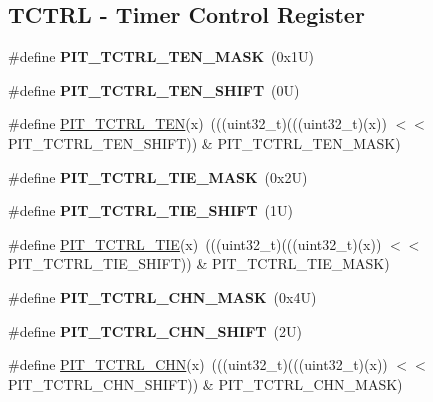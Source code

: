 \subsection*{T\+C\+T\+RL -\/ Timer Control Register}
\begin{DoxyCompactItemize}
\item 
\mbox{\label{group___p_i_t___register___masks_ga1099670711f996f5fa84e33bbfe794b2}} 
\#define {\bfseries P\+I\+T\+\_\+\+T\+C\+T\+R\+L\+\_\+\+T\+E\+N\+\_\+\+M\+A\+SK}~(0x1\+U)
\item 
\mbox{\label{group___p_i_t___register___masks_ga0080137ff0378087f08cc12fd10b3e1f}} 
\#define {\bfseries P\+I\+T\+\_\+\+T\+C\+T\+R\+L\+\_\+\+T\+E\+N\+\_\+\+S\+H\+I\+FT}~(0\+U)
\item 
\#define \mbox{\hyperlink{group___p_i_t___register___masks_gaecd36aa22b2758d6c39b6b2df234e3a8}{P\+I\+T\+\_\+\+T\+C\+T\+R\+L\+\_\+\+T\+EN}}(x)~(((uint32\+\_\+t)(((uint32\+\_\+t)(x)) $<$$<$ P\+I\+T\+\_\+\+T\+C\+T\+R\+L\+\_\+\+T\+E\+N\+\_\+\+S\+H\+I\+FT)) \& P\+I\+T\+\_\+\+T\+C\+T\+R\+L\+\_\+\+T\+E\+N\+\_\+\+M\+A\+SK)
\item 
\mbox{\label{group___p_i_t___register___masks_ga99639aabcac1d6042d14e7893d00bf67}} 
\#define {\bfseries P\+I\+T\+\_\+\+T\+C\+T\+R\+L\+\_\+\+T\+I\+E\+\_\+\+M\+A\+SK}~(0x2\+U)
\item 
\mbox{\label{group___p_i_t___register___masks_gae21aee9e81741a924c9f2824fbc5775b}} 
\#define {\bfseries P\+I\+T\+\_\+\+T\+C\+T\+R\+L\+\_\+\+T\+I\+E\+\_\+\+S\+H\+I\+FT}~(1\+U)
\item 
\#define \mbox{\hyperlink{group___p_i_t___register___masks_gaa39036db7a5f8baae6f986b5809d054c}{P\+I\+T\+\_\+\+T\+C\+T\+R\+L\+\_\+\+T\+IE}}(x)~(((uint32\+\_\+t)(((uint32\+\_\+t)(x)) $<$$<$ P\+I\+T\+\_\+\+T\+C\+T\+R\+L\+\_\+\+T\+I\+E\+\_\+\+S\+H\+I\+FT)) \& P\+I\+T\+\_\+\+T\+C\+T\+R\+L\+\_\+\+T\+I\+E\+\_\+\+M\+A\+SK)
\item 
\mbox{\label{group___p_i_t___register___masks_ga734e2e947c649d50b9ca46405e451c2b}} 
\#define {\bfseries P\+I\+T\+\_\+\+T\+C\+T\+R\+L\+\_\+\+C\+H\+N\+\_\+\+M\+A\+SK}~(0x4\+U)
\item 
\mbox{\label{group___p_i_t___register___masks_ga9a1c8aa25a05c9b2c9503a003fa8d24d}} 
\#define {\bfseries P\+I\+T\+\_\+\+T\+C\+T\+R\+L\+\_\+\+C\+H\+N\+\_\+\+S\+H\+I\+FT}~(2\+U)
\item 
\#define \mbox{\hyperlink{group___p_i_t___register___masks_gaeab3c9394c0312620a55449b2daeeaf8}{P\+I\+T\+\_\+\+T\+C\+T\+R\+L\+\_\+\+C\+HN}}(x)~(((uint32\+\_\+t)(((uint32\+\_\+t)(x)) $<$$<$ P\+I\+T\+\_\+\+T\+C\+T\+R\+L\+\_\+\+C\+H\+N\+\_\+\+S\+H\+I\+FT)) \& P\+I\+T\+\_\+\+T\+C\+T\+R\+L\+\_\+\+C\+H\+N\+\_\+\+M\+A\+SK)
\end{DoxyCompactItemize}
